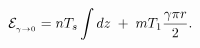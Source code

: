 \begin{equation}
{\cal E}_{{}_{\gamma\to 0}}=nT_s\int dz\; +\; mT_1\frac{\gamma\pi r}{2}.
\label{u2}
\end{equation}

